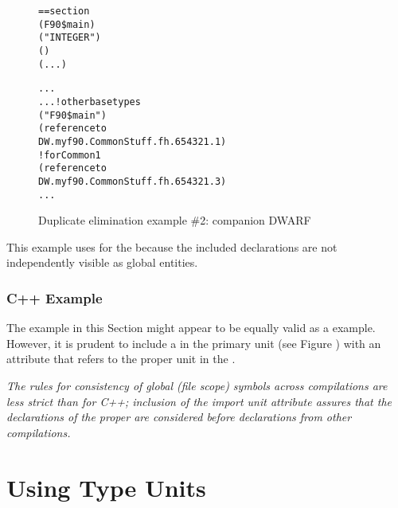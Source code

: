 \begin{figure}
\begin{dwflisting}
\begin{alltt}
== section \dotdebuginfo{}
    \DWTAGcompileunit
        \DWATname(F90\$main)
        \DWTAGbasetype
            \DWATname("INTEGER")
            \DWATencoding(\DWATEsigned)
            \DWATbytesize(...)

        \DWTAGbasetype
            ...
        ...  ! other base types
        \DWTAGsubprogram
            \DWATname("F90\$main")
            \DWTAGimportedunit
                \DWATimport(reference to
                    DW.myf90.CommonStuff.fh.654321.1)
            \DWTAGcommoninclusion ! for Common1
                \DWATcommonreference(reference to
                    DW.myf90.CommonStuff.fh.654321.3)
            ...
\end{alltt}
\end{dwflisting}
\caption{Duplicate elimination example \#2: companion DWARF }
\label{fig:duplicateeliminationexample2companiondwarf}
\end{figure}

This example uses \DWTAGpartialunit{} for the 
because the included declarations are not independently
visible as global entities.


\subsubsection{C++ Example}

The  example 
in this Section might appear to be equally
valid as a  example. However, it is prudent to include
a \DWTAGimportedunit{}
in the primary unit 
(see Figure )
with an \DWATimport{} attribute that refers to the proper unit
in the .

\textit{The  rules for consistency of global (file scope) symbols
across compilations are less strict than for C++; inclusion
of the import unit attribute assures that the declarations of
the proper  are considered before declarations
from other compilations.}


\section{Using Type Units}
\label{app:usingtypeunits}

